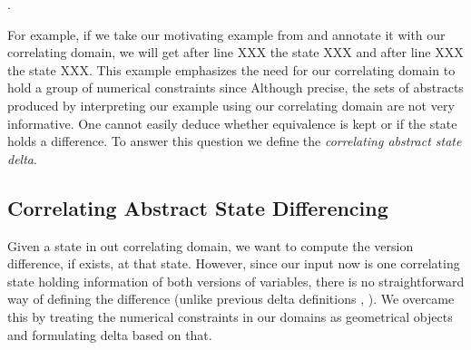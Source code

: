 .

For example, if we take our motivating example from \figref{} and annotate it with our correlating domain, we will get after line XXX the state XXX and after line XXX the state XXX. This example emphasizes the need for our correlating domain to hold a group of numerical constraints since
Although precise, the sets of abstracts produced by interpreting our example using our correlating domain are not very informative. One cannot easily deduce whether equivalence is kept or if the state holds a difference. To answer this question we define the \emph{correlating abstract state delta}.

\subsection{Correlating Abstract State Differencing} 
Given a state in out correlating domain, we want to compute the version difference, if exists, at that state. However, since our input now is one correlating state holding information of both versions of variables, there is no straightforward way of defining the difference (unlike previous delta definitions , ). We overcame this by treating the numerical constraints in our domains as geometrical objects and formulating delta based on that.

